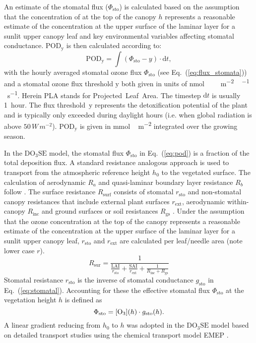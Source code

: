 \documentclass[bg, manuscript]{copernicus}
\begin{document}
An estimate of the stomatal  flux ($\Phi_\mathrm{sto}$) is calculated based on the assumption that the concentration of  at the top of the canopy $h$ represents a reasonable estimate of the concentration at the upper surface of the laminar layer for a sunlit upper canopy leaf and key environmental variables affecting stomatal conductance. $\mathrm{POD_y}$ is then calculated according to:
%
\begin{equation}
  \mathrm{POD_y} = \int{(\Phi_\mathrm{sto}-y)\cdot \mathrm{d}t},
  \label{eq:pod}
\end{equation}
%
with the hourly averaged stomatal ozone flux $\Phi_\mathrm{sto}$ (see Eq.~(\ref{eq:flux_stomata})) and a stomatal ozone flux threshold $\mathrm{y}$ both given in units of \unit{nmol\,\,m^{-2}\,^{-1}\,s^{-1}}. Herein PLA stands for Projected~Leaf~Area. The timestep $\mathrm{d}t$ is usually 1~hour. The flux threshold~$\mathrm{y}$ represents the detoxification potential of the plant and is typically only exceeded during daylight hours (i.e. when global radiation is above $50\,\unit{W\,m^{-2}}$). $\mathrm{POD_y}$ is given in \unit{mmol\,m^{-2}} integrated over the growing season.

In the $\mathrm{DO_3SE}$ model, the stomatal flux $\Phi_\mathrm{sto}$ in Eq.~(\ref{eq:pod}) is a fraction of the total  deposition flux. A standard resistance analogous approach \citep{AE:Wesely1989} is used to transport  from the atmospheric reference height $h_0$ to the vegetated surface. The calculation of aerodynamic $R_a$ and quasi-laminar boundary layer resistance $R_b$ follow \citet{WASP:Simpson2003,ACP:Simpson2012}. The surface resistance $R_\mathrm{surf}$ consists of stomatal $r_\mathrm{sto}$ and non-stomatal canopy resistances that include external plant surfaces $r_\mathrm{ext}$, aerodynamic within-canopy $R_\mathrm{inc}$ and ground surfaces or soil resistances $R_\mathrm{gs}$ \citep{WASP:Simpson2003,ACP:Simpson2012}. Under the assumption that the ozone concentration \chem{[O_3]} at the top of the canopy represents a reasonable estimate of the concentration at the upper surface of the laminar layer for a sunlit upper canopy leaf, $r_\mathrm{sto}$ and $r_\mathrm{ext}$ are calculated per leaf/needle area (note lower case $r$).
%
\begin{equation}
  R_\mathrm{sur} = \frac{1}{\frac{\mathrm{LAI}}{r_\mathrm{sto}}+\frac{\mathrm{SAI}}{r_\mathrm{ext}}+\frac{1}{R_\mathrm{inc}+R_\mathrm{gs}}}
\end{equation}
%
Stomatal resistance $r_\mathrm{sto}$ is the inverse of stomatal conductance $g_\mathrm{sto}$ in Eq.~(\ref{eq:stomatal}). Accounting for these the effective stomatal flux $\Phi_\mathrm{sto}$ at the vegetation height $h$ is defined as
%
\begin{equation}
  \Phi_\mathrm{sto} = \chem{[O_3]}(h) \cdot g_\mathrm{sto}(h).
  \label{eq:flux_stomata}
\end{equation}
A linear gradient reducing \chem{[O_3]} from $h_0$ to $h$ was adopted in the $\mathrm{DO_3SE}$ model based on detailed transport studies using the chemical transport model EMEP \citep{ACP:Simpson2012,ICP:MappingManual2017}.
\end{document}
